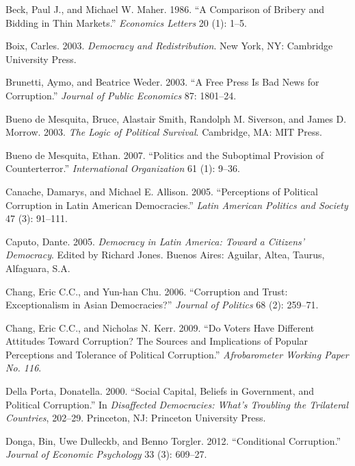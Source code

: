 \documentclass[11pt,]{article}
\begin{document}
\hypertarget{ref-beckmaher1986cbb}{}
Beck, Paul J., and Michael W. Maher. 1986. ``A Comparison of Bribery and
Bidding in Thin Markets.'' \emph{Economics Letters} 20 (1): 1--5.

\hypertarget{ref-boix2003dr}{}
Boix, Carles. 2003. \emph{Democracy and Redistribution}. New York, NY:
Cambridge University Press.

\hypertarget{ref-brunettiweder2003fpbn}{}
Brunetti, Aymo, and Beatrice Weder. 2003. ``A Free Press Is Bad News for
Corruption.'' \emph{Journal of Public Economics} 87: 1801--24.

\hypertarget{ref-bdmetal2003lps}{}
Bueno de Mesquita, Bruce, Alastair Smith, Randolph M. Siverson, and
James D. Morrow. 2003. \emph{The Logic of Political Survival}.
Cambridge, MA: MIT Press.

\hypertarget{ref-bdm2007psp}{}
Bueno de Mesquita, Ethan. 2007. ``Politics and the Suboptimal Provision
of Counterterror.'' \emph{International Organization} 61 (1): 9--36.

\hypertarget{ref-canacheallison2005ppc}{}
Canache, Damarys, and Michael E. Allison. 2005. ``Perceptions of
Political Corruption in Latin American Democracies.'' \emph{Latin
American Politics and Society} 47 (3): 91--111.

\hypertarget{ref-caputo2005dla}{}
Caputo, Dante. 2005. \emph{Democracy in Latin America: Toward a
Citizens' Democracy}. Edited by Richard Jones. Buenos Aires: Aguilar,
Altea, Taurus, Alfaguara, S.A.

\hypertarget{ref-changchu2006ct}{}
Chang, Eric C.C., and Yun-han Chu. 2006. ``Corruption and Trust:
Exceptionalism in Asian Democracies?'' \emph{Journal of Politics} 68
(2): 259--71.

\hypertarget{ref-changkerr2009dvh}{}
Chang, Eric C.C., and Nicholas N. Kerr. 2009. ``Do Voters Have Different
Attitudes Toward Corruption? The Sources and Implications of Popular
Perceptions and Tolerance of Political Corruption.'' \emph{Afrobarometer
Working Paper No. 116}.

\hypertarget{ref-dellaporta2000scbg}{}
Della Porta, Donatella. 2000. ``Social Capital, Beliefs in Government,
and Political Corruption.'' In \emph{Disaffected Democracies: What's
Troubling the Trilateral Countries}, 202--29. Princeton, NJ: Princeton
University Press.

\hypertarget{ref-dongaetal2012cc}{}
Donga, Bin, Uwe Dulleckb, and Benno Torgler. 2012. ``Conditional
Corruption.'' \emph{Journal of Economic Psychology} 33 (3): 609--27.
\end{document}
